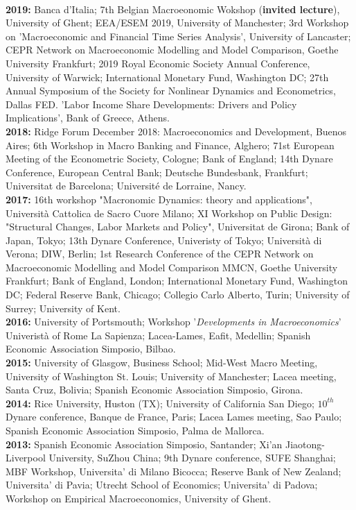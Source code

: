 \documentclass[margin, 11pt]{res} %
\begin{document}
\begin{resume}
\\
\textbf{2019:} {Banca d'Italia; 7th Belgian Macroeonomic Wokshop (\textbf{invited lecture}), University of Ghent; EEA/ESEM 2019, University of Manchester; 3rd Workshop on 'Macroeconomic and Financial Time Series Analysis', University of Lancaster; CEPR Network on Macroeconomic Modelling and Model Comparison, Goethe University Frankfurt; 2019 Royal Economic Society Annual Conference, University of Warwick; International Monetary Fund, Washington DC; 27th Annual Symposium of the Society for Nonlinear Dynamics and Econometrics, Dallas FED. 'Labor Income Share Developments: Drivers and Policy Implications', Bank of Greece, Athens.}
\\
\textbf{2018:} {Ridge Forum December 2018: Macroeconomics and Development, Buenos Aires; 6th Workshop in Macro Banking and Finance, Alghero; 71st European Meeting of the Econometric Society, Cologne; Bank of England; 14th Dynare Conference, European Central Bank; Deutsche Bundesbank, Frankfurt; Universitat de Barcelona; Universit\'{e} de Lorraine, Nancy.} 
\\
\textbf{2017:} {16th workshop "Macronomic Dynamics: theory and applications", Universit\`{a} Cattolica de Sacro Cuore Milano;  XI Workshop on Public Design: "Structural Changes, Labor Markets and Policy", Universitat de Girona; Bank of Japan, Tokyo; 13th Dynare Conference, Univeristy of Tokyo; Universit\`{a} di Verona; DIW, Berlin; 1st Research Conference of the CEPR Network on Macroeconomic Modelling and Model Comparison MMCN, Goethe University Frankfurt; Bank of England, London; International Monetary Fund, Washington DC; Federal Reserve Bank, Chicago; Collegio Carlo Alberto, Turin; University of Surrey; University of Kent.} 
\\
\textbf{2016:} {University of Portsmouth; Workshop '\emph{Developments in Macroeconomics}' Univerist\`{a} of Rome La Sapienza; Lacea-Lames, Eafit, Medellin; Spanish Economic Association Simposio, Bilbao.} 
\\
\textbf{2015:} {University of Glasgow, Business School; Mid-West Macro Meeting, University of Washington St. Louis; University of Manchester; Lacea meeting, Santa Cruz, Bolivia; Spanish Economic Association Simposio, Girona.} 
\\
\textbf{2014:} {Rice University, Huston (TX); University of California San Diego; $10^{th}$ Dynare conference, Banque de France, Paris; Lacea Lames meeting, Sao Paulo; Spanish Economic Association Simposio, Palma de Mallorca.} 
\\
\textbf{2013:} {Spanish Economic Association Simposio, Santander; Xi'an Jiaotong-Liverpool University, SuZhou China; 9th Dynare conference, SUFE Shanghai; MBF Workshop, Universita' di Milano Bicocca; Reserve Bank of New Zealand; Universita' di Pavia; Utrecht School of Economics; Universita' di Padova; Workshop on Empirical Macroeconomics, University of Ghent.}

\end{resume}
\end{document}
